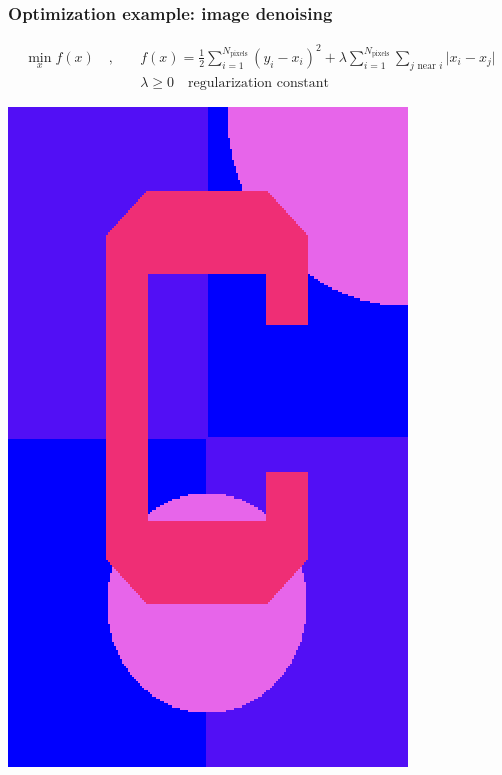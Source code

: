 \documentclass[12pt]{beamer}
\begin{document}
\begin{frame}
\frametitle{Optimization example: image denoising}
\vspace{-0.5cm}
\begin{equation*}
\begin{split}
\min_x f(x) \quad,\quad & f(x) = \frac{1}{2}\sum_{i=1}^{N_{\text{pixels}}} (y_i - x_i)^2 + 
\lambda \sum_{i=1}^{N_{\text{pixels}}} \sum_{j \text{ near } i} \lvert x_i - x_j \rvert \\
& \lambda \ge 0 \quad\text{regularization constant}
\end{split}
\end{equation*}
\begin{center}
\begin{minipage}[t]{0.2\textwidth}
\includegraphics[width=\textwidth]{c_clean.png} \\

\end{minipage}
\end{center}
\end{frame}
\end{document}
